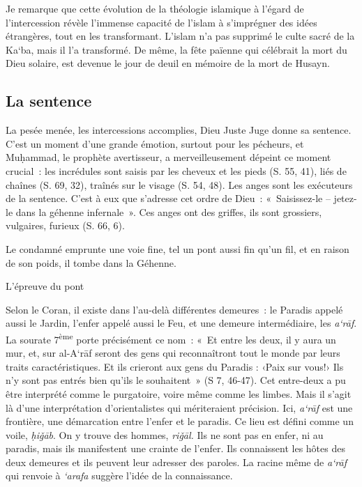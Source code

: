 Je remarque que cette évolution de la théologie islamique à l'égard de
l'intercession révèle l'immense capacité de l'islam à s'imprégner des
idées étrangères, tout en les transformant. L'islam n'a pas supprimé le
culte sacré de la Ka`ba, mais il l'a transformé. De même, la fête
païenne qui célébrait la mort du Dieu solaire, est devenue le jour de
deuil en mémoire de la mort de Husayn.


\subsection{{La sentence
}}

La pesée menée, les intercessions accomplies, Dieu Juste Juge donne sa
sentence. C'est un moment d'une grande émotion, surtout pour les
pécheurs, et Muḥammad, le prophète avertisseur, a merveilleusement
dépeint ce moment crucial~: les incrédules sont saisis par les cheveux
et les pieds (S. 55, 41), liés de chaînes (S. 69, 32), traînés sur le
visage (S. 54, 48). Les anges sont les exécuteurs de la sentence. C'est
à eux que s'adresse cet ordre de Dieu~: «~Saisissez-le -- jetez-le dans
la géhenne infernale~». Ces anges ont des griffes, ils sont grossiers,
vulgaires, furieux (S. 66, 6).

Le condamné emprunte une voie fine, tel un pont aussi fin qu'un fil, et
en raison de son poids, il tombe dans la Géhenne.



L'épreuve du pont



Selon le Coran, il existe dans l'au-delà différentes demeures~: le
Paradis appelé aussi le Jardin, l'enfer appelé aussi le Feu, et une
demeure intermédiaire, les \emph{a`rāf}. La sourate
7\textsuperscript{ème} porte précisément ce nom~: «~Et entre les deux,
il y aura un mur, et, sur al-A`rāf seront des gens qui reconnaîtront
tout le monde par leurs traits caractéristiques. Et ils crieront aux
gens du Paradis : ‹Paix sur vous!› Ils n'y sont pas entrés bien qu'ils
le souhaitent~» (S 7, 46-47). Cet entre-deux a pu être interprété comme
le purgatoire, voire même comme les limbes. Mais il s'agit là d'une
interprétation d'orientalistes qui mériteraient précision. Ici,
\emph{a`rāf} est une frontière, une démarcation entre l'enfer et le
paradis. Ce lieu est défini comme un voile, \emph{ḥiǧāb}. On y trouve
des hommes, \emph{riǧāl.} Ils ne sont pas en enfer, ni au paradis, mais
ils manifestent une crainte de l'enfer. Ils connaissent les hôtes des
deux demeures et ils peuvent leur adresser des paroles. La racine même
de \emph{a`rāf} qui renvoie à \emph{`arafa} suggère l'idée de la
connaissance.

